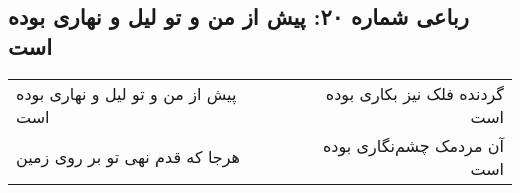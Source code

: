 \begin{center}
\section*{رباعی شماره ۲۰: پیش از من و تو لیل و نهاری بوده است}
\label{sec:sh020}
\begin{longtable}{l p{0.5cm} r}
پیش از من و تو لیل و نهاری بوده است
&&
گردنده فلک نیز بکاری بوده است
\\
هرجا که قدم نهی تو بر روی زمین
&&
آن مردمک چشم‌نگاری بوده است
\\
\end{longtable}
\end{center}
